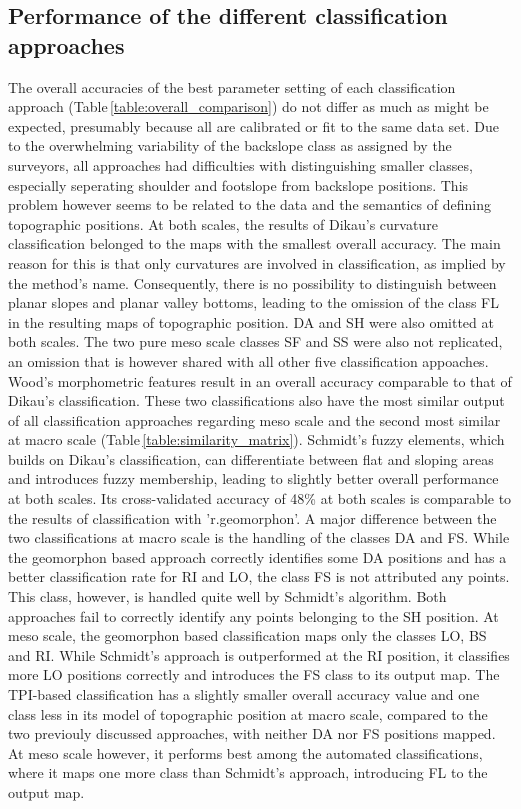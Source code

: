 \documentclass[preprint,12pt,authoryear]{elsarticle}
\begin{document}
\subsection{Performance of the different classification approaches}  
The overall accuracies of the best parameter setting of each classification approach (Table\,\ref{table:overall_comparison}) do not differ as much as might be expected, presumably because all are calibrated or fit to the same data set. Due to the overwhelming variability of the backslope class as assigned by the surveyors, all approaches had difficulties with distinguishing smaller classes, especially seperating shoulder and footslope from backslope positions. This problem however seems to be related to the data and the semantics of defining topographic positions. 
At both scales, the results of Dikau's curvature classification belonged to the maps with the smallest overall accuracy. The main reason for this is that only curvatures are involved in classification, as implied by the method's name. Consequently, there is no possibility to distinguish between planar slopes and planar valley bottoms, leading to the omission of the class FL in the resulting maps of topographic position. DA and SH were also omitted at both scales. The two pure meso scale classes SF and SS were also not replicated, an omission that is however shared with all other five classification appoaches. Wood's morphometric features result in an overall accuracy comparable to that of Dikau's classification. These two classifications also have the most similar output of all classification approaches regarding meso scale and the second most similar at macro scale (Table\,\ref{table:similarity_matrix}). Schmidt's fuzzy elements, which builds on Dikau's classification, can differentiate between flat and sloping areas and introduces fuzzy membership, leading to slightly better overall performance at both scales. Its cross-validated accuracy of 48\% at both scales is comparable to the results of classification with 'r.geomorphon'.  A major difference between the two classifications at macro scale is the handling of the classes DA and FS. While the geomorphon based approach correctly identifies some DA positions and has a better classification rate for RI and LO, the class FS is not attributed any points. This class, however, is handled quite well by Schmidt's algorithm. Both approaches fail to correctly identify any points belonging to the SH position. At meso scale, the geomorphon based classification maps only the classes LO, BS and RI. While Schmidt's approach is outperformed at the RI position, it classifies more LO positions correctly and introduces the FS class to its output map. The TPI-based classification has a slightly smaller overall accuracy value and one class less in its model of topographic position at macro scale, compared to the two previouly discussed approaches, with neither DA nor FS positions mapped. At meso scale however, it performs best among the automated classifications, where it maps one more class than Schmidt's approach, introducing FL to the output map. 
\end{document}
